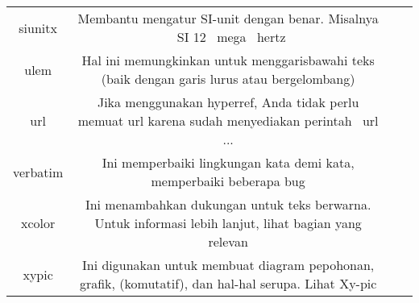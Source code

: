 \begin{table}[ht]
\begin{tabular}{cccc}
		siunitx&Membantu mengatur SI-unit dengan benar. Misalnya \ SI {12} {\ mega \ hertz}&\\
		ulem&Hal ini memungkinkan untuk menggarisbawahi teks (baik dengan garis lurus atau bergelombang)&\\
		url&Jika menggunakan hyperref, Anda tidak perlu memuat url karena sudah menyediakan perintah \ url {...}&\\
		verbatim&Ini memperbaiki lingkungan kata demi kata, memperbaiki beberapa bug&\\
		xcolor&Ini menambahkan dukungan untuk teks berwarna. Untuk informasi lebih lanjut, lihat bagian yang relevan&\\
		xypic&Ini digunakan untuk membuat diagram pepohonan, grafik, (komutatif), dan hal-hal serupa. Lihat Xy-pic&\\
		\hline
	\end{tabular}
\end{table} \par

